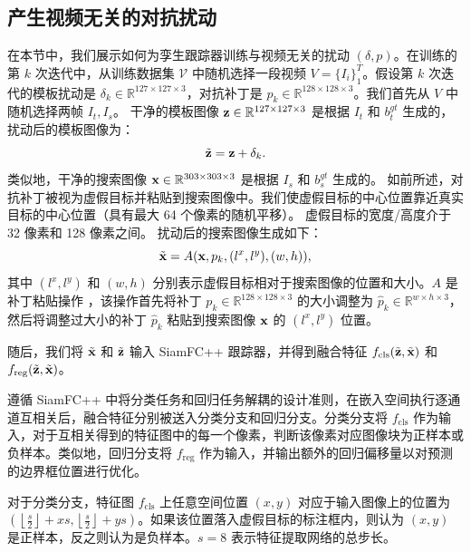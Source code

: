 \subsection{产生视频无关的对抗扰动}
在本节中，我们展示如何为孪生跟踪器训练与视频无关的扰动 $(\delta, p)$。在训练的第 $k$ 次迭代中，从训练数据集 $\mathcal V$ 中随机选择一段视频 $V=\{I_i\}_1^T$。假设第 $k$ 次迭代的模板扰动是 $\delta_k \in \mathbb{R}^{127\times 127 \times 3}$，对抗补丁是 $p_k \in \mathbb{R}^{128\times 128\times 3}$。我们首先从 $V$ 中随机选择两帧 $I_t, I_s$。
干净的模板图像 $\textbf z\in \mathbb{R}^{127\times 127 \times 3}$ 是根据 $I_t$ 和 $b^{gt}_t$ 生成的，扰动后的模板图像为：
\begin{equation}
\tilde {\textbf z} = \textbf z + \delta_k.
\end{equation}
类似地，干净的搜索图像 $\textbf x \in \mathbb{R}^{303\times 303 \times 3}$ 是根据 $I_s$ 和 $b^{gt}_s$ 生成的。
如前所述，对抗补丁被视为虚假目标并粘贴到搜索图像中。我们使虚假目标的中心位置靠近真实目标的中心位置（具有最大 64 个像素的随机平移）。
虚假目标的宽度/高度介于 32 像素和 128 像素之间。
扰动后的搜索图像生成如下：
\begin{equation}
\tilde{\textbf x} = A(\textbf x, p_k, (l^x, l^y), (w, h)),
\end{equation}
其中 $(l^x, l^y)$ 和 $(w, h)$ 分别表示虚假目标相对于搜索图像的位置和大小。$A$ 是补丁粘贴操作 \cite{patch}，该操作首先将补丁 $p_k \in \mathbb{R}^{128\times 128\times 3}$ 的大小调整为 $\hat{p}_k \in \mathbb{R}^{w\times h\times 3}$，然后将调整过大小的补丁 $\hat{p}_k$ 粘贴到搜索图像 $\textbf x$ 的 $(l^x,l^y)$ 位置。

随后，我们将 $\tilde {\textbf x}$ 和 $\tilde{\textbf z}$ 输入 SiamFC++ 跟踪器，并得到融合特征 $f_{\mathrm{cls}}(\tilde{\textbf z}, \tilde {\textbf x})$ 和 $f_{\mathrm{reg}}(\tilde{\textbf z}, \tilde {\textbf x})$。

遵循 SiamFC++ \cite{SiamFC++} 中将分类任务和回归任务解耦的设计准则，在嵌入空间执行逐通道互相关后，融合特征分别被送入分类分支和回归分支。分类分支将 $f_{\mathrm{cls}}$ 作为输入，对于互相关得到的特征图中的每一个像素，判断该像素对应图像块为正样本或负样本。类似地，回归分支将 $f_{\mathrm{reg}}$ 作为输入，并输出额外的回归偏移量以对预测的边界框位置进行优化。

对于分类分支，特征图 $f_{\mathrm{cls}}$ 上任意空间位置 $(x,y)$ 对应于输入图像上的位置为 $\left(\left\lfloor\frac{s}{2}\right\rfloor+x s,\left\lfloor\frac{s}{2}\right\rfloor+y s\right)$。如果该位置落入虚假目标的标注框内，则认为 $(x,y)$ 是正样本，反之则认为是负样本。$s=8$ 表示特征提取网络的总步长。

